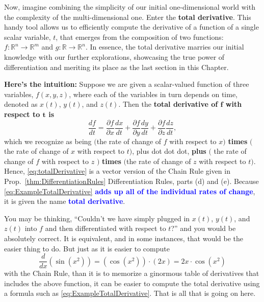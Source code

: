 
Now, imagine combining the simplicity of our initial one-dimensional world with the complexity of the multi-dimensional one. Enter the \textbf{total derivative}. This handy tool allows us to efficiently compute the derivative of a function of a single scalar variable, \( t \), that emerges from the composition of two functions: \( f: \mathbb{R}^{n} \to \mathbb{R}^{m} \) and \( g: \mathbb{R} \to \mathbb{R}^{n} \). In essence, the total derivative marries our initial knowledge with our further explorations, showcasing the true power of differentiation and meriting its place as the last section in this Chapter.

\textbf{Here's the intuition:} Suppose we are given a scalar-valued function of three variables, $f(x, y, z)$, where each of the variables in turn depends on time, denoted as $x(t)$, $y(t)$, and $z(t)$. Then the \textbf{total derivative of $\bm{f}$ with respect to $\bm{t}$ is} 
\begin{equation}
\label{eq:ExampleTotalDerivative}
    \frac{df}{dt} = \frac{ \partial f}{\partial x}  \frac{ d x}{dt}+  \frac{ \partial f}{\partial y} \frac{ d y}{dt} + \frac{ \partial f}{\partial z}  \frac{ d z}{dt},
\end{equation}
which we recognize as being $\bm{\big(}$the rate of change of $f$ with respect to $x$$\bm{\big)}$ \textbf{times} $\bm{\big(}$the rate of change of $x$ with respect to $t$$\bm{\big)}$, plus dot dot dot, \textbf{plus} 
$\bm{\big(}$ the rate of change of $f$ with respect to $z$ $\bm{\big)}$ \textbf{times} $\bm{\big(}$the rate of change of $z$ with respect to $t$$\bm{\big)}$. Hence, \eqref{eq:totalDerivative} is a vector version of the Chain Rule given in Prop.~\ref{thm:DifferentiationRules} Differentiation Rules, parts (d) and (e). Because \eqref{eq:ExampleTotalDerivative} \textcolor{blue}{\bf adds up all of the individual rates of change}, it is given the name \textcolor{blue}{\bf total derivative}.

You may be thinking, ``Couldn't we have simply plugged in $x(t)$, $y(t)$, and $z(t)$ into $f$ and then differentiated with respect to $t$?'' and you would be absolutely correct. It is equivalent, and in some instances, that would be the easier thing to do. But just as it is easier to compute 
$$ \frac{d}{dx}\left(\sin(x^2) \right) =  \left( \cos(x^2) \right)\cdot \left(2x \right) = 2 x \cdot \cos(x^2)$$
with the Chain Rule, than it is to memorize a ginormous table of derivatives that includes the above function, it can be easier to compute the total derivative using a formula such as \eqref{eq:ExampleTotalDerivative}. That is all that is going on here. 



